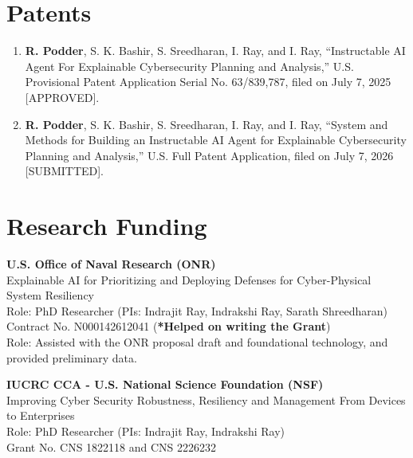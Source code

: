 \documentclass[11pt, a4paper]{article}
\begin{document}
\section{Patents}

\begin{enumerate}[leftmargin=*, label=\arabic*., itemsep=4pt, topsep=2pt]
\item \textbf{\color{cvred}R. Podder}, S. K. Bashir, S. Sreedharan, I. Ray, and I. Ray, ``Instructable AI Agent For Explainable Cybersecurity Planning and Analysis,'' U.S. Provisional Patent Application Serial No. 63/839,787, filed on July 7, 2025 [APPROVED].

\item \textbf{\color{cvred}R. Podder}, S. K. Bashir, S. Sreedharan, I. Ray, and I. Ray, ``System and Methods for Building an Instructable AI Agent for Explainable Cybersecurity Planning and Analysis,'' U.S. Full Patent Application, filed on July 7, 2026 [SUBMITTED].

\end{enumerate}

\section{Research Funding}

\textbf{\color{cvred}U.S. Office of Naval Research (ONR)}\\
  Explainable AI for Prioritizing and Deploying Defenses for Cyber-Physical System Resiliency\\
  Role: PhD Researcher (PIs: Indrajit Ray, Indrakshi Ray, Sarath Shreedharan) \\
  Contract No. N000142612041 (\textbf{*Helped on writing the Grant}) \\
  Role: Assisted with the ONR proposal draft and foundational technology, and provided preliminary data.

\medskip
\textbf{\color{cvred}IUCRC CCA - U.S. National Science Foundation (NSF)}\\
  Improving Cyber Security Robustness, Resiliency and Management From Devices to Enterprises\\
  Role: PhD Researcher (PIs: Indrajit Ray, Indrakshi Ray)\\
  Grant No. CNS 1822118 and CNS 2226232
\end{document}

